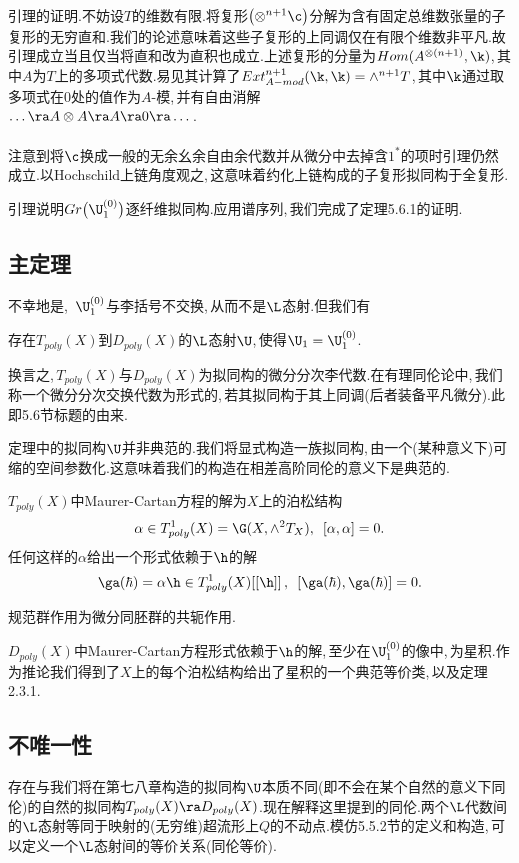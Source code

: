 引理的证明.不妨设$T$的维数有限.将复形$\bigl(\otimes ^{n+1} \c\bigr)$分解为含有固定总维数张量的子复形的无穷直和.我们的论述意味着这些子复形的上同调仅在有限个维数非平凡.故引理成立当且仅当将直和改为直积也成立.上述复形的分量为$Hom(A^{\otimes (n+1)},\k)$,\,其中$A$为$T$上的多项式代数.易见其计算了$Ext^{n+1}_{A-mod}(\k,\k)=\wedge^{n+1} T$,\,其中$\k$通过取多项式在$0$处的值作为$A$-模,\,并有自由消解\\
$\dots\ra A\otimes A\ra A\ra 0\ra\dots$.
\\
\\
注意到将$\c$换成一般的无余幺余自由余代数并从微分中去掉含$1^*$的项时引理仍然成立.以Hochschild上链角度观之,\,这意味着约化上链构成的子复形拟同构于全复形.

引理说明$Gr\bigl(\U_1^{(0)}\bigr)$逐纤维拟同构.应用谱序列,\,我们完成了定理5.6.1的证明.



\subsection{主定理}
不幸地是,\,\,\,$\U_1^{(0)}$与李括号不交换,\,从而不是$\L$态射.但我们有

\begin{thm}
存在$T_{poly}(X)$到$D_{poly}(X)$的$\L$态射$\U$,\,使得$\U_1=\U_1^{(0)}$.
\end{thm}

换言之,\,$T_{poly}(X)$与$D_{poly}(X)$为拟同构的微分分次李代数.在有理同伦论中,\,我们称一个微分分次交换代数为形式的,\,若其拟同构于其上同调(后者装备平凡微分).此即5.6节标题的由来.

定理中的拟同构$\U$并非典范的.我们将显式构造一族拟同构,\,由一个(某种意义下)可缩的空间参数化.这意味着我们的构造在相差高阶同伦的意义下是典范的.

$T_{poly}(X)$中Maurer-Cartan方程的解为$X$上的泊松结构
$$\alpha
      \in T_{poly}^1(X)=\G(X,\wedge^2 T_X),\,\,\,[\alpha,\alpha]=0.$$
任何这样的$\alpha$给出一个形式依赖于$\h$的解
$$\ga(\hbar)=\alpha\h\in T_{poly}^1(X)[[\h]]\,,\,\,\,
        [\ga(\hbar),\ga(\hbar)]=0.$$

规范群作用为微分同胚群的共轭作用.

$D_{poly}(X)$中Maurer-Cartan方程形式依赖于$\h$的解,\,至少在$\U_1^{(0)}$的像中,\,为星积.作为推论我们得到了$X$上的每个泊松结构给出了星积的一个典范等价类,\,以及定理2.3.1.



\subsection{不唯一性}
存在与我们将在第七八章构造的拟同构$\U$本质不同(即不会在某个自然的意义下同伦)的自然的拟同构$T_{poly}(X)\ra D_{poly}(X)$.现在解释这里提到的同伦.两个$\L$代数间的$\L$态射等同于映射的(无穷维)超流形上$Q$的不动点.模仿5.5.2节的定义和构造,\,可以定义一个$\L$态射间的等价关系(同伦等价).

